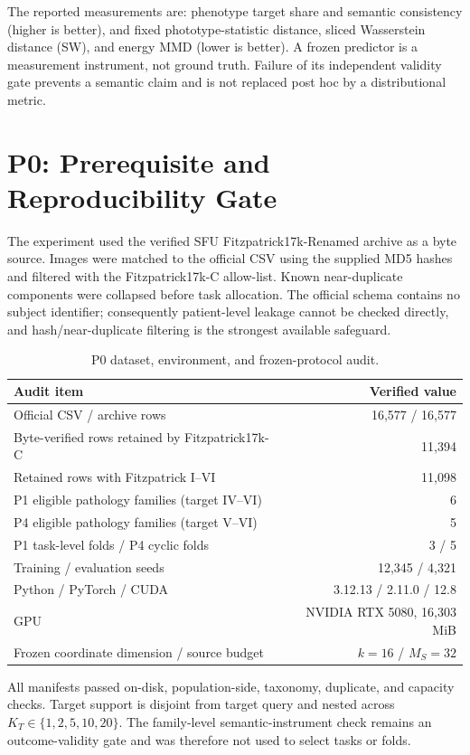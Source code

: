 \documentclass{article}
\newcommand{\KT}{K_T}
\newcommand{\MS}{M_S}
\begin{document}
The reported measurements are: phenotype target share and semantic consistency
(higher is better), and fixed phototype-statistic distance, sliced Wasserstein distance
(SW), and energy MMD (lower is better).  A frozen predictor is a measurement instrument, not
ground truth.  Failure of its independent validity gate prevents a semantic claim and is not
replaced post hoc by a distributional metric.

\section{P0: Prerequisite and Reproducibility Gate}

The experiment used the verified SFU Fitzpatrick17k-Renamed archive as a byte source.  Images
were matched to the official CSV using the supplied MD5 hashes and filtered with the
Fitzpatrick17k-C allow-list.  Known near-duplicate components were collapsed before task
allocation.  The official schema contains no subject identifier; consequently patient-level
leakage cannot be checked directly, and hash/near-duplicate filtering is the strongest
available safeguard.

\begin{table}[h]
\caption{P0 dataset, environment, and frozen-protocol audit.}
\label{tab:p0}
\centering
\small
\begin{tabular}{lr}
\toprule
Audit item & Verified value \\
\midrule
Official CSV / archive rows & 16,577 / 16,577 \\
Byte-verified rows retained by Fitzpatrick17k-C & 11,394 \\
Retained rows with Fitzpatrick I--VI & 11,098 \\
P1 eligible pathology families (target IV--VI) & 6 \\
P4 eligible pathology families (target V--VI) & 5 \\
P1 task-level folds / P4 cyclic folds & 3 / 5 \\
Training / evaluation seeds & 12,345 / 4,321 \\
Python / PyTorch / CUDA & 3.12.13 / 2.11.0 / 12.8 \\
GPU & NVIDIA RTX 5080, 16,303 MiB \\
Frozen coordinate dimension / source budget & $k=16$ / $\MS=32$ \\
\bottomrule
\end{tabular}
\end{table}

All manifests passed on-disk, population-side, taxonomy, duplicate, and capacity checks.
Target support is disjoint from target query and nested across $\KT\in\{1,2,5,10,20\}$.
The family-level semantic-instrument check remains an outcome-validity gate and was therefore
not used to select tasks or folds.
\end{document}
